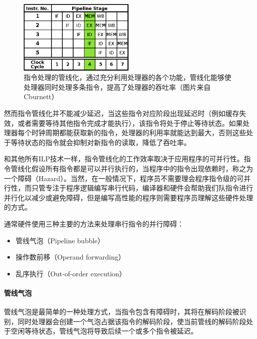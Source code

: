 \begin{figure}
	\sidecaption
	\includegraphics[width=0.5\textwidth]{figures/rp/5-Stage-Pipeline}
	\caption{指令处理的管线化，通过充分利用处理器的各个功能，管线化能够使处理器同时处理多条指令，提高了处理器的吞吐率（图片来自Cburnett）}
	\label{f:rp-5-Stage-Pipeline}
\end{figure}

然而指令管线化并不能减少延迟，当这些指令对应阶段出现延迟时（例如缓存失效，或者需要等待其他指令完成才能执行），该指令将处于停止等待状态。如果处理器每个时钟周期都能获取新的指令，处理器的利用率就能达到最大，否则这些处于等待状态的指令就会抑制对新指令的读取，降低了吞吐率。

和其他所有ILP技术一样，指令管线化的工作效率取决于应用程序的可并行性。指令管线化假设所有指令都是可以并行执行的，当程序中的指令出现依赖时，称之为一个障碍（Hazard）。当然，在一般情况下，程序员不需要理会程序指令级的可并行性，而只管专注于程序逻辑编写串行代码，编译器和硬件会帮助我们队指令进行并行化以减少或避免障碍，但是编写高性能的程序则需要程序员理解这些硬件处理的方式。

通常硬件使用三种主要的方法来处理串行指令的并行障碍：

\begin{itemize}
	\item 管线气泡（Pipeline bubble）
	\item 操作数前移（Operand forwarding）
	\item 乱序执行（Out-of-order execution）
\end{itemize}




\paragraph{管线气泡}
管线气泡是最简单的一种处理方式，当指令包含有障碍时，其将在解码阶段被识别，同时处理器会创建一个气泡占据该指令的解码阶段，使当前管线的解码阶段处于空闲等待状态，管线气泡将导致后续一个或多个指令被延迟。

